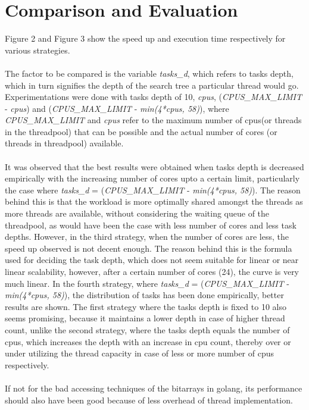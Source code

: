 \documentclass[a4paper,10pt,twoside]{article}
\begin{document}
\section{Comparison and Evaluation}
Figure 2 and Figure 3 show the speed up and execution time respectively for various strategies.\\ \\
The factor to be compared is the variable \textit{tasks\_d}, which refers to tasks depth, which in turn signifies the depth of the search tree a particular thread would go. Experimentations were done with tasks depth of 10, \textit{cpus}, (\textit{CPUS\_MAX\_LIMIT} - \textit{cpus}) and (\textit{CPUS\_MAX\_LIMIT} - \textit{min(4*cpus, 58)}), where \textit{CPUS\_MAX\_LIMIT} and \textit{cpus} refer to the maximum number of cpus(or threads in the threadpool) that can be possible and the actual number of cores (or threads in threadpool) available. \\ \\
It was observed that the best results were obtained when tasks depth is decreased empirically with the increasing number of cores upto a certain limit, particularly the case where \textit{tasks\_d} = (\textit{CPUS\_MAX\_LIMIT} - \textit{min(4*cpus, 58)}). The reason behind this is that the workload is more optimally shared amongst the threads as more threads are available, without considering the waiting queue of the threadpool, as would have been the case with less number of cores and less task depths. However, in the third strategy, when the number of cores are less, the speed up observed is not decent enough. The reason behind this is the formula used for deciding the task depth, which does not seem suitable for linear or near linear scalability, however, after a certain number of cores (24), the curve is very much linear. In the fourth strategy, where  \textit{tasks\_d} = (\textit{CPUS\_MAX\_LIMIT} - \textit{min(4*cpus, 58)}), the distribution of tasks has been done empirically, better results are shown. The first strategy where the tasks depth is fixed to 10 also seems promising, because it maintains a lower depth in case of higher thread count, unlike the second strategy, where the tasks depth equals the number of cpus, which increases the depth with an increase in cpu count, thereby over or under utilizing the thread capacity in case of less or more number of cpus respectively.\\ \\
If not for the bad accessing techniques of the bitarrays in golang, its performance should also have been good because of less overhead of thread implementation.
\end{document}
